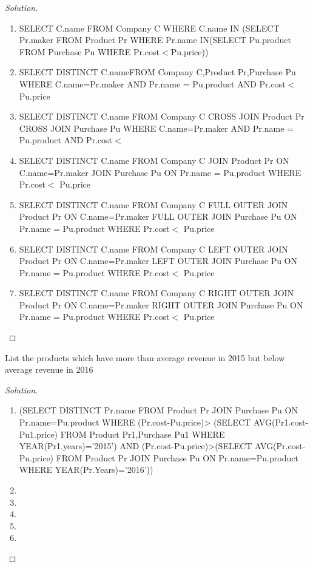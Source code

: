 \documentclass[10pt,a4paper]{article}
\newenvironment{problem}[2][Problem]{\begin{trivlist}
\item[\hskip \labelsep {\bfseries #1}\hskip \labelsep {\bfseries #2.}]}{\end{trivlist}}
\begin{document}
\begin{proof}[Solution]
\begin{enumerate}
	\item SELECT C.name FROM Company C WHERE C.name IN (SELECT Pr.maker FROM Product Pr WHERE Pr.name IN(SELECT Pu.product FROM Purchase Pu WHERE Pr.cost$<$Pu.price))
			\item SELECT DISTINCT C.nameFROM Company C,Product Pr,Purchase Pu
WHERE C.name=Pr.maker AND Pr.name = Pu.product AND  Pr.cost$<$ Pu.price
	\item SELECT DISTINCT C.name FROM Company C CROSS JOIN Product Pr CROSS JOIN Purchase Pu WHERE C.name=Pr.maker AND Pr.name = Pu.product AND  Pr.cost$<$
	\item SELECT DISTINCT C.name FROM Company C JOIN Product Pr
ON C.name=Pr.maker JOIN Purchase Pu ON Pr.name = Pu.product WHERE Pr.cost$<$ Pu.price 
	\item SELECT DISTINCT C.name FROM Company C FULL OUTER JOIN Product Pr
ON C.name=Pr.maker FULL OUTER JOIN Purchase Pu ON Pr.name = Pu.product WHERE Pr.cost$<$ Pu.price 
	\item SELECT DISTINCT C.name FROM Company C LEFT OUTER JOIN Product Pr ON C.name=Pr.maker LEFT OUTER JOIN Purchase Pu ON Pr.name = Pu.product WHERE Pr.cost$<$ Pu.price
	\item SELECT DISTINCT C.name FROM Company C RIGHT OUTER JOIN Product Pr ON C.name=Pr.maker RIGHT OUTER JOIN Purchase Pu ON Pr.name = Pu.product WHERE Pr.cost$<$ Pu.price
\end{enumerate}
\end{proof}

\begin{problem}{10}
List the products which have more than average revenue in 2015 but below average revenue in 2016
\end{problem}

\begin{proof}[Solution]
\begin{enumerate}
	\item (SELECT DISTINCT Pr.name FROM Product Pr JOIN Purchase Pu
ON Pr.name=Pu.product WHERE (Pr.cost-Pu.price)> (SELECT AVG(Pr1.cost- Pu1.price) FROM Product Pr1,Purchase Pu1 WHERE YEAR(Pr1.years)='2015') AND (Pr.cost-Pu.price)>(SELECT AVG(Pr.cost-Pu.price) FROM Product Pr JOIN Purchase Pu ON Pr.name=Pu.product WHERE YEAR(Pr.Years)='2016'))
	\item
	\item
	\item
	\item
	\item
\end{enumerate}
\end{proof}
\end{document}
